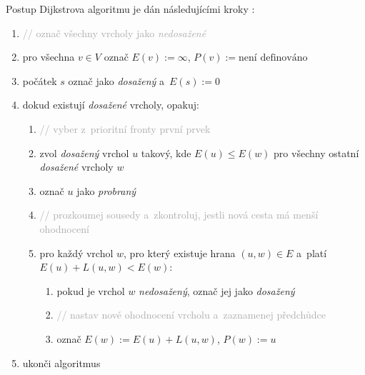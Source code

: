 {\normalsize
\colorbox{gray!10}{%
\begin{minipage}{0.95\textwidth}
\vspace{0.5em}
\begin{minipage}[t]{0.98\textwidth}
		
		Postup Dijkstrova algoritmu je dán následujícími kroky \cite{mffDijkstraKucera}:
		\begin{enumerate}
			\item[] \textcolor{darkgray}{\small // označ všechny vrcholy jako \textit{nedosažené}}
		\item pro všechna $v \in V$ označ $E(v) := \infty$, $P(v) := \text{není definováno}$ 
		\item počátek $s$ označ jako \textit{dosažený} a~$E(s) := 0$
		\item dokud existují \textit{dosažené} vrcholy, opakuj:
		\begin{enumerate}[label ={\normalfont\itembox(0.1em)(0.1em){\arabic{enumi}.\arabic*}}]
			\item[] \textcolor{darkgray}{\small // vyber z~prioritní fronty první prvek}
			\item zvol \textit{dosažený} vrchol $u$ takový, kde $E(u) \leq E(w)$ pro všechny ostatní \textit{dosažené} vrcholy $w$
			\item označ $u$ jako \textit{probraný}		
			\item[] \textcolor{darkgray}{\small // prozkoumej sousedy a~zkontroluj, jestli nová cesta má menší ohodnocení}
			\item pro každý vrchol $w$, pro který existuje hrana $(u,w) \in E$ a~platí $E(u) + L(u,w) < E(w)$:
			\begin{enumerate}[label = {\normalfont\arabic{enumi}.\arabic{enumii}.\arabic*}]
				\item pokud je vrchol $w$ \textit{nedosažený}, označ jej jako \textit{dosažený}
				\item[] \textcolor{darkgray}{\small // nastav nové ohodnocení vrcholu a~zaznamenej předchůdce}
				\item označ $E(w) := E(u) + L(u,w)$, $P(w) := u$
			\end{enumerate}
		\end{enumerate}
		\item ukonči algoritmus
	\end{enumerate}
\end{minipage}

\vspace{0.5em}
\end{minipage}%
}}

